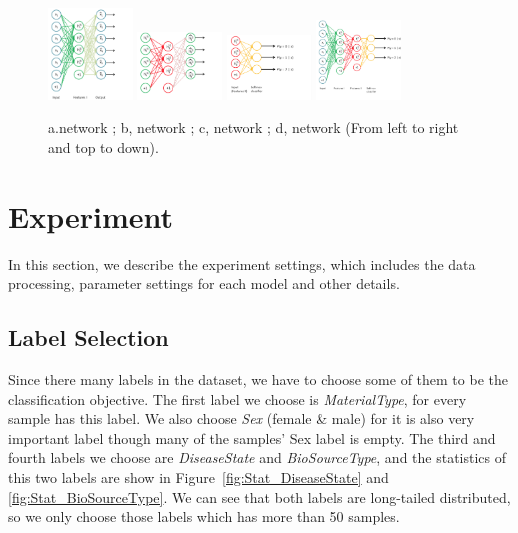 \documentclass[sigconf]{acmart}
\begin{document}
\begin{figure}[]
	\centering
	\includegraphics[width=0.2\textwidth]{../figs/pretrain1.png}
	\includegraphics[width=0.2\textwidth]{../figs/pretrain2.png}
	\includegraphics[width=0.2\textwidth]{../figs/pretrain3.png}
	\includegraphics[width=0.2\textwidth]{../figs/pretrain4.png}
	\caption{a.network ;  b, network ; c, network ; d, network  (From left to right and top to down). }
	\label{pretrain_1}
	\centering
\end{figure}

	
	\section{Experiment}
	In this section, we describe the experiment settings, which includes the data processing, parameter settings for each model and other details.
	
	\subsection{Label Selection}
	Since there many labels in the dataset, we have to choose some of them to be the classification objective. The first label we choose is \textit{MaterialType}, for every sample has this label. We also choose \textit{Sex} (female \& male) for it is also very important label though many of the samples' Sex label is empty. The third and fourth labels we choose are \textit{DiseaseState} and \textit{BioSourceType}, and the statistics of this two labels are show in Figure~\ref{fig:Stat_DiseaseState} and \ref{fig:Stat_BioSourceType}. We can see that both labels are long-tailed distributed, so we only choose those labels which has more than 50 samples. 
	
\end{document}

